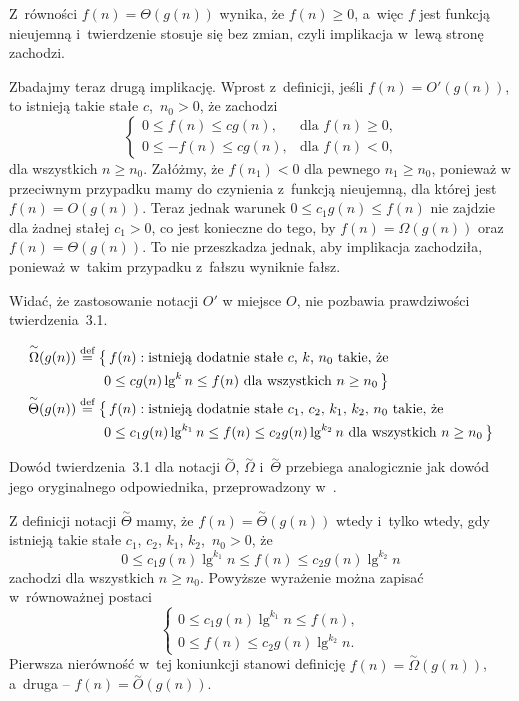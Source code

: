 Z~równości $f(n)=\Theta(g(n))$ wynika, że $f(n)\ge0$, a~więc $f$ jest funkcją nieujemną i~twierdzenie stosuje się bez zmian, czyli implikacja w~lewą stronę zachodzi.

Zbadajmy teraz drugą implikację. Wprost z~definicji, jeśli $f(n)=O'(g(n))$, to istnieją takie stałe $c$,~$n_0>0$, że zachodzi
\[
	\begin{cases}
		0 \le f(n) \le cg(n), & \text{dla $f(n)\ge0$,} \\
		0 \le -f(n) \le cg(n), & \text{dla $f(n)<0$,}
	\end{cases}
\]
dla wszystkich $n\ge n_0$. Załóżmy, że $f(n_1)<0$ dla pewnego $n_1\ge n_0$, ponieważ w przeciwnym przypadku mamy do czynienia z~funkcją nieujemną, dla której jest $f(n)=O(g(n))$. Teraz jednak warunek $0\le c_1g(n)\le f(n)$ nie zajdzie dla żadnej stałej $c_1>0$, co jest konieczne do tego, by $f(n)=\Omega(g(n))$ oraz $f(n)=\Theta(g(n))$. To nie przeszkadza jednak, aby implikacja zachodziła, ponieważ w~takim przypadku z~fałszu wyniknie fałsz.

Widać, że zastosowanie notacji $O'$ w miejsce $O$, nie pozbawia prawdziwości twierdzenia~3.1.

\subproblem %
\[
	\begin{split}
		\overset{\sim}{\Omega}(g(n)) &\stackrel{\text{\scriptsize def}}{=} \bigl\{\,f(n):\text{istnieją dodatnie stałe $c$,~$k$,~$n_0$ takie, że} \\
		&\qquad 0 \le cg(n)\lg^kn \le f(n) \text{ dla wszystkich $n \ge n_0$}\,\bigr\} \\
		\overset{\sim}{\Theta}(g(n)) &\stackrel{\text{\scriptsize def}}{=} \bigl\{\,f(n):\text{istnieją dodatnie stałe $c_1$,~$c_2$,~$k_1$,~$k_2$,~$n_0$ takie, że} \\
		&\qquad 0 \le c_1g(n)\lg^{k_1}n \le f(n) \le c_2g(n)\lg^{k_2}n \text{ dla wszystkich $n \ge n_0$}\,\bigr\}
	\end{split}
\]

Dowód twierdzenia~3.1 dla notacji $\overset{\sim}{O}$, $\overset{\sim}{\Omega}$ i~$\overset{\sim}{\Theta}$ przebiega analogicznie jak dowód jego oryginalnego odpowiednika, przeprowadzony w~.

Z definicji notacji $\overset{\sim}{\Theta}$ mamy, że $f(n)=\overset{\sim}{\Theta}(g(n))$ wtedy i~tylko wtedy, gdy istnieją takie stałe $c_1$, $c_2$, $k_1$, $k_2$,~$n_0>0$, że
\[
	0 \le c_1g(n)\lg^{k_1}n \le f(n) \le c_2g(n)\lg^{k_2}n
\]
zachodzi dla wszystkich $n\ge n_0$. Powyższe wyrażenie można zapisać w~równoważnej postaci
\[
	\begin{cases}
		0 \le c_1g(n)\lg^{k_1}n \le f(n), \\
		0 \le f(n) \le c_2g(n)\lg^{k_2}n.
	\end{cases}
\]
Pierwsza nierówność w~tej koniunkcji stanowi definicję $f(n)=\overset{\sim}{\Omega}(g(n))$, a~druga -- $f(n)=\overset{\sim}{O}(g(n))$.


